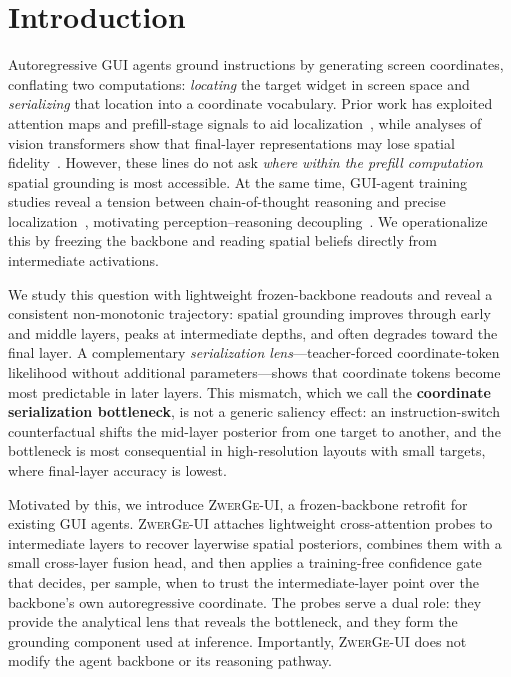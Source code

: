 
\section{Introduction}
\label{sec:intro}

Autoregressive GUI agents ground instructions by generating screen coordinates, conflating two computations: \emph{locating} the target widget in screen space and \emph{serializing} that location into a coordinate vocabulary.
Prior work has exploited attention maps and prefill-stage signals to aid localization~\citep{xu2025attention,wu2025gui,lin2026happens}, while analyses of vision transformers show that final-layer representations may lose spatial fidelity~\citep{darcet2024registers,lan2024clearclip,chen2025rethinking}.
However, these lines do not ask \emph{where within the prefill computation} spatial grounding is most accessible.
At the same time, GUI-agent training studies reveal a tension between chain-of-thought reasoning and precise localization~\citep{xu2026mobile,yang2026gui,zhou2025gui,zhang2025does}, motivating perception--reasoning decoupling~\citep{zhang2026omegause}.
We operationalize this by freezing the backbone and reading spatial beliefs directly from intermediate activations.

We study this question with lightweight frozen-backbone readouts and reveal a consistent non-monotonic trajectory: spatial grounding improves through early and middle layers, peaks at intermediate depths, and often degrades toward the final layer.
A complementary \emph{serialization lens}---teacher-forced coordinate-token likelihood without additional parameters---shows that coordinate tokens become most predictable in later layers.
This mismatch, which we call the \textbf{coordinate serialization bottleneck}, is not a generic saliency effect: an instruction-switch counterfactual shifts the mid-layer posterior from one target to another, and the bottleneck is most consequential in high-resolution layouts with small targets, where final-layer accuracy is lowest.

Motivated by this, we introduce \textsc{ZwerGe-UI}, a frozen-backbone retrofit for existing GUI agents.
\textsc{ZwerGe-UI} attaches lightweight cross-attention probes to intermediate layers to recover layerwise spatial posteriors, combines them with a small cross-layer fusion head, and then applies a training-free confidence gate that decides, per sample, when to trust the intermediate-layer point over the backbone's own autoregressive coordinate.
The probes serve a dual role: they provide the analytical lens that reveals the bottleneck, and they form the grounding component used at inference.
Importantly, \textsc{ZwerGe-UI} does not modify the agent backbone or its reasoning pathway.

